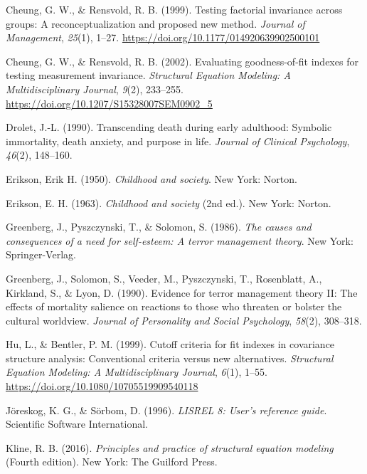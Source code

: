 \documentclass[
  english,
  man]{apa6}
\newlength{\cslhangindent}
\newenvironment{CSLReferences}[2] %
 {\begin{list}{}{%
  \setlength{\itemindent}{0pt}
  \setlength{\leftmargin}{0pt}
  \setlength{\parsep}{0pt}
  \ifodd #1
   \setlength{\leftmargin}{\cslhangindent}
   \setlength{\itemindent}{-1\cslhangindent}
  \fi
  \setlength{\itemsep}{#2\baselineskip}}}
 {\end{list}}
\begin{document}
\begin{CSLReferences}{1}{0}
Cheung, G. W., \& Rensvold, R. B. (1999). Testing factorial invariance across groups: A reconceptualization and proposed new method. \emph{Journal of Management}, \emph{25}(1), 1--27. \url{https://doi.org/10.1177/014920639902500101}

Cheung, G. W., \& Rensvold, R. B. (2002). Evaluating goodness-of-fit indexes for testing measurement invariance. \emph{Structural Equation Modeling: A Multidisciplinary Journal}, \emph{9}(2), 233--255. \url{https://doi.org/10.1207/S15328007SEM0902_5}

Drolet, J.-L. (1990). Transcending death during early adulthood: Symbolic immortality, death anxiety, and purpose in life. \emph{Journal of Clinical Psychology}, \emph{46}(2), 148--160.

Erikson, Erik H. (1950). \emph{Childhood and society}. New York: Norton.

Erikson, E. H. (1963). \emph{Childhood and society} (2nd ed.). New York: Norton.

Greenberg, J., Pyszczynski, T., \& Solomon, S. (1986). \emph{The causes and consequences of a need for self-esteem: A terror management theory}. New York: Springer-Verlag.

Greenberg, J., Solomon, S., Veeder, M., Pyszczynski, T., Rosenblatt, A., Kirkland, S., \& Lyon, D. (1990). Evidence for terror management theory II: The effects of mortality salience on reactions to those who threaten or bolster the cultural worldview. \emph{Journal of Personality and Social Psychology}, \emph{58}(2), 308--318.

Hu, L., \& Bentler, P. M. (1999). Cutoff criteria for fit indexes in covariance structure analysis: Conventional criteria versus new alternatives. \emph{Structural Equation Modeling: A Multidisciplinary Journal}, \emph{6}(1), 1--55. \url{https://doi.org/10.1080/10705519909540118}

Jöreskog, K. G., \& Sörbom, D. (1996). \emph{LISREL 8: User's reference guide}. Scientific Software International.

Kline, R. B. (2016). \emph{Principles and practice of structural equation modeling} (Fourth edition). New York: The Guilford Press.


\end{CSLReferences}
\end{document}
